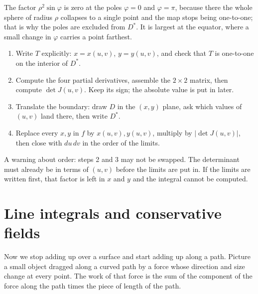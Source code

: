 The factor $\rho^{2}\sin\varphi$ is zero at the poles $\varphi=0$ and $\varphi=\pi$,
because there the whole sphere of radius $\rho$ collapses to a single point and the map stops being
one-to-one; that is why the poles are excluded from $D^{*}$. It is largest at the
equator, where a small change in $\varphi$ carries a point farthest.

\begin{resep}
\begin{enumerate}
\item Write $T$ explicitly: $x=x(u,v)$, $y=y(u,v)$, and check that $T$
  is one-to-one on the interior of $D^{*}$.
\item Compute the four partial derivatives, assemble the $2\times2$ matrix, then compute
  $\det J(u,v)$. Keep its sign; the absolute value is put in later.
\item Translate the boundary: draw $D$ in the $(x,y)$ plane, ask which values of $(u,v)$
  land there, then write $D^{*}$.
\item Replace every $x,y$ in $f$ by $x(u,v),y(u,v)$, multiply by
  $|\det J(u,v)|$, then close with $du\,dv$ in the order of the limits.
\end{enumerate}
A warning about order: steps 2 and 3 may not be swapped. The determinant must already
be in terms of $(u,v)$ before the limits are put in. If the limits are written first, that factor is left in $x$ and $y$ and
the integral cannot be computed.
\end{resep}




\section{Line integrals and conservative fields}

Now we stop adding up over a surface and start adding up
along a path. Picture a small object dragged along a curved path by a force whose
direction and size change at every point. The work of that force is the sum of the component of the force along the path times the piece of
length of the path.

